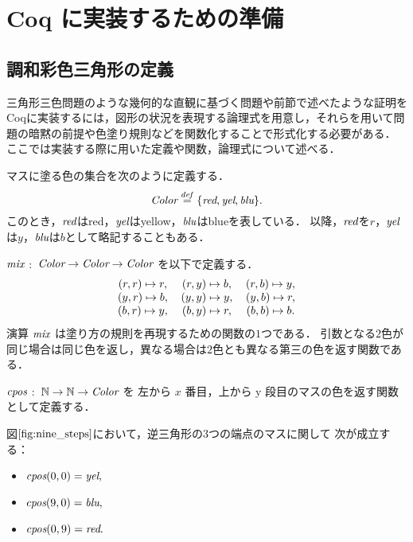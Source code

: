 \section{ Coq に実装するための準備}
\subsection{調和彩色三角形の定義}
三角形三色問題のような幾何的な直観に基づく問題や前節で述べたような証明をCoqに実装するには，図形の状況を表現する論理式を用意し，それらを用いて問題の暗黙の前提や色塗り規則などを関数化することで形式化する必要がある．
ここでは実装する際に用いた定義や関数，論理式について述べる．
\begin{dfn}[$\Color$]
  マスに塗る色の集合を次のように定義する．
  \[
  \textit{Color} \overset{{\it def}}{=} \{\textit{red}, \textit{yel}, \textit{blu}\}.
  \]
  このとき，$\textit{red}$は{\rm{red}}，$\textit{yel}$は{\rm{yellow}}，$\textit{blu}$は{\rm{blue}}を表している．
  以降，$\textit{red}$を$r$，$\textit{yel}$は$y$，$\textit{blu}$は$b$として略記することもある．
\end{dfn}
\begin{dfn}[$\mix$]
  $\mix$ $:$ $\textit{Color} \to \textit{Color} \to \textit{Color}$ を以下で定義する．
  \[
  \begin{tabular}{ccccc}
    $(r,r) \Pto r,$ & $(r,y) \Pto b,$ & $(r,b) \Pto y,$ \\
    $(y,r) \Pto b,$ & $(y,y) \Pto y,$ & $(y,b) \Pto r,$ \\
    $(b,r) \Pto y,$ & $(b,y) \Pto r,$ & $(b,b) \Pto b.$ \\
  \end{tabular}
  \]
  演算 $\mix$ は塗り方の規則を再現するための関数の$1$つである．
  引数となる$2$色が同じ場合は同じ色を返し，異なる場合は$2$色とも異なる第三の色を返す関数である．
\end{dfn}
\begin{dfn}[$\cpos$]
  $\cpos$ $:$ $\mathbb{N} \to \mathbb{N} \to \textit{Color}$ を
  左から $x$ 番目，上から y 段目のマスの色を返す関数として定義する．
\end{dfn}
\begin{exm}
  図$\ref{fig:nine_steps}$において，逆三角形の$3$つの端点のマスに関して
  次が成立する：
  \begin{itemize}
    \item $\textit{cpos}(0,0) = \textit{yel},$
    \item $\textit{cpos}(9,0) = \textit{blu},$
    \item $\textit{cpos}(0,9) = \textit{red}.$
  \end{itemize}
\end{exm}
